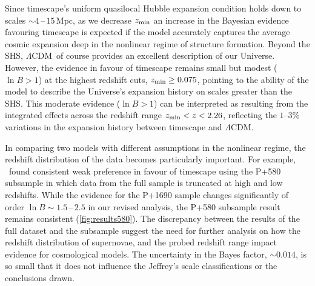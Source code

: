 \documentclass[fleqn,usenatbib,onecolumn,referee]{mnras}
\newcommand{\LA}{\Lambda}
\newcommand{\LCDM}{$\LA$CDM}
\newcommand{\laneetal}{\citet{Lane_2023}}
\newcommand{\goesas}{\mathop{\sim}\limits}
\newcommand{\ns}[1]{_{\rm #1}}
\newcommand{\zmin}{z\ns{min}}
\begin{document}
Since timescape's uniform quasilocal Hubble expansion condition holds down to scales $\goesas4\,$--$\,15\,$Mpc, as we decrease $\zmin$ an increase in the Bayesian evidence favouring timescape is expected if the model accurately captures the average cosmic expansion deep in the nonlinear regime of structure formation. Beyond the SHS, \LCDM\ of course provides an excellent description of our Universe. However, the evidence in favour of timescape remains small but modest ($\ln B > 1$) at the highest redshift cuts, $\zmin \geq 0.075$, pointing to the ability of the model to describe the Universe's expansion history on scales greater than the SHS. This moderate evidence ($\ln B > 1$) can be interpreted as resulting from the integrated effects across the redshift range $\zmin<z<2.26$, reflecting the $1$--$3$\% variations in the expansion history between timescape and \LCDM.

In comparing two models with different assumptions in the nonlinear regime, the redshift distribution of the data becomes particularly important. For example, \laneetal\ found consistent weak preference in favour of timescape using the P+580 subsample in which data from the full sample is truncated at high and low redshifts. While the evidence for the P+1690 sample changes significantly of order $\ln B \sim 1.5\,$--$\,2.5$  in our revised analysis, the P+580 subsample result remains consistent (\cref{fig:results580}). The discrepancy between the results of the full dataset and the subsample suggest the need for further analysis on how the redshift distribution of supernovae, and the probed redshift range impact evidence for cosmological models. The uncertainty in the Bayes factor,  $\sim0.014$, is so small that it does not influence the Jeffrey's scale classifications or the conclusions drawn.
\end{document}
